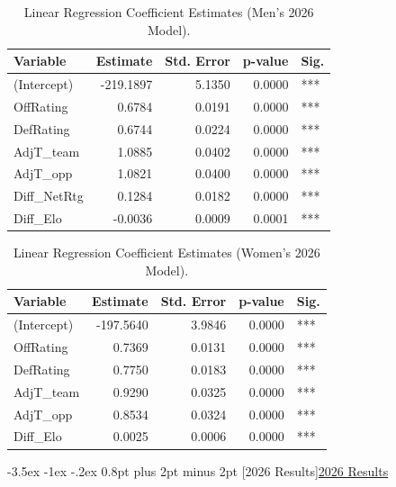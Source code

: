 \documentclass[12pt,leqno]{article}\usepackage[pdftex]{graphicx}\usepackage[dvipsnames]{xcolor}
\makeatletter
\renewcommand\subsection{\@startsection {subsection}{1}{\z@}%
{-3.5ex \@plus -1ex \@minus -.2ex}%
{0.8pt plus 2pt minus 2pt}%
{\normalfont}}
\newcommand{\usubsection}[1]{\subsection[#1]{\centering\normalfont\underline{#1}}}%
\theoremstyle{remark}
\makeatother
\begin{document}
\begin{table}[ht]
\centering
\begin{tabular}{lrrrl}
  \hline
Variable & Estimate & Std. Error & p-value & Sig. \\ 
  \hline
(Intercept) & -219.1897 & 5.1350 & 0.0000 & *** \\ 
  OffRating & 0.6784 & 0.0191 & 0.0000 & *** \\ 
  DefRating & 0.6744 & 0.0224 & 0.0000 & *** \\ 
  AdjT\_team & 1.0885 & 0.0402 & 0.0000 & *** \\ 
  AdjT\_opp & 1.0821 & 0.0400 & 0.0000 & *** \\ 
  Diff\_NetRtg & 0.1284 & 0.0182 & 0.0000 & *** \\ 
  Diff\_Elo & -0.0036 & 0.0009 & 0.0001 & *** \\ 
   \hline
\end{tabular}
\caption{Linear Regression Coefficient Estimates (Men’s 2026 Model).} 
\label{tab:mens_coef_2026}
\end{table}


\begin{table}[ht]
\centering
\begin{tabular}{lrrrl}
  \hline
Variable & Estimate & Std. Error & p-value & Sig. \\ 
  \hline
(Intercept) & -197.5640 & 3.9846 & 0.0000 & *** \\ 
  OffRating & 0.7369 & 0.0131 & 0.0000 & *** \\ 
  DefRating & 0.7750 & 0.0183 & 0.0000 & *** \\ 
  AdjT\_team & 0.9290 & 0.0325 & 0.0000 & *** \\ 
  AdjT\_opp & 0.8534 & 0.0324 & 0.0000 & *** \\ 
  Diff\_Elo & 0.0025 & 0.0006 & 0.0000 & *** \\ 
   \hline
\end{tabular}
\caption{Linear Regression Coefficient Estimates (Women’s 2026 Model).} 
\label{tab:womens_coef_2026}
\end{table}



\usubsection{2026 Results}
\end{document}
